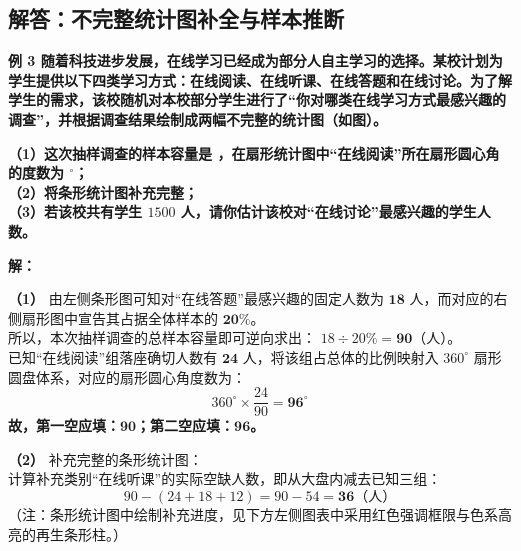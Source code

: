 ﻿%

\subsection{解答：不完整统计图补全与样本推断}

\vspace{0.6cm}

\textbf{例 3 \quad 随着科技进步发展，在线学习已经成为部分人自主学习的选择。某校计划为学生提供以下四类学习方式：在线阅读、在线听课、在线答题和在线讨论。为了解学生的需求，该校随机对本校部分学生进行了“你对哪类在线学习方式最感兴趣的调查”，并根据调查结果绘制成两幅不完整的统计图（如图）。}

\vspace{0.4cm}

\textbf{（1）这次抽样调查的样本容量是 \underline{\makebox[1.5cm]{}}，在扇形统计图中“在线阅读”所在扇形圆心角的度数为 \underline{\makebox[1.5cm]{}}$^\circ$；\\
（2）将条形统计图补充完整；\\
（3）若该校共有学生 $1500$ 人，请你估计该校对“在线讨论”最感兴趣的学生人数。}

\vspace{0.4cm}
\textbf{解：}

\textbf{（1）} 由左侧条形图可知对“在线答题”最感兴趣的固定人数为 $\boldsymbol{18}$ 人，而对应的右侧扇形图中宣告其占据全体样本的 $\boldsymbol{20\%}$。\\
所以，本次抽样调查的总样本容量即可逆向求出： $18 \div 20\% = \boldsymbol{90}$（人）。\\
已知“在线阅读”组落座确切人数有 $\boldsymbol{24}$ 人，将该组占总体的比例映射入 $360^\circ$ 扇形圆盘体系，对应的扇形圆心角度数为：
$$360^\circ \times \frac{24}{90} = \boldsymbol{96^\circ}$$
\textbf{故，第一空应填：$\boldsymbol{90}$；第二空应填：$\boldsymbol{96}$。}

\vspace{0.4cm}

\textbf{（2）} 补充完整的条形统计图：\\
计算补充类别“在线听课”的实际空缺人数，即从大盘内减去已知三组：
$$90 - (24 + 18 + 12) = 90 - 54 = \boldsymbol{36}\text{（人）}$$
（注：条形统计图中绘制补充进度，见下方左侧图表中采用红色强调框限与色系高亮的再生条形柱。）

